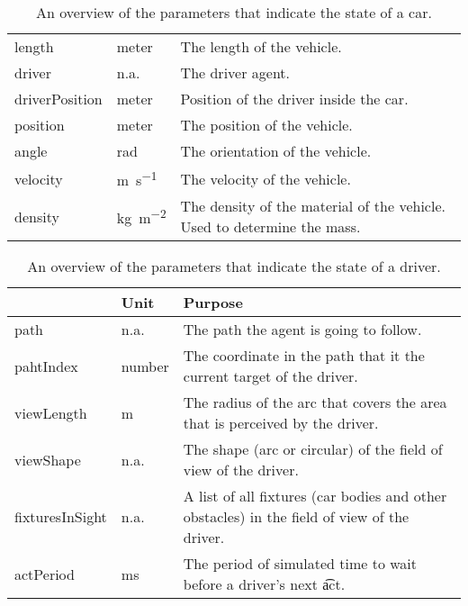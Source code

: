 \begin{table}
\begin{tabularx}{\textwidth}{>{\ttfamily}llX}
		length 					
			& \si{meter} 
			& The length of the vehicle. \\ 
		driver 					
			& n.a. 
			& The driver agent. \\
		driverPosition
			& \si{meter}
			& Position of the driver inside the car. \\
		position
			& \si{meter}
			& The position of the vehicle. \\
		angle
			& \si{\radian}
			& The orientation of the vehicle. \\
		velocity
			& \si{\meter\per\second}
			& The velocity of the vehicle. \\
		density
			& \si{\kg\per\square\meter}
			& The density of the material of the vehicle. Used to determine the mass. \\
		\bottomrule
	\end{tabularx}
	\caption{An overview of the parameters that indicate the state of a car.}
	\label{tab:par:method:model:overview:state:lowlevel:car}
\end{table}

\begin{table}
	\centering
	\begin{tabularx}{\textwidth}{>{\ttfamily}llX}
		\toprule
		\normalfont{Parameter}	&Unit & Purpose \\ 
		\midrule
		path					
			& n.a. 
			& The path the agent is going to follow. \\
		pahtIndex
			& number
			& The coordinate in the path that it the current target of the driver.\\
		viewLength 			
			& \si{\meter}
			& The radius of the arc that covers the area that is perceived by the driver.\\ 
		viewShape
			& n.a.
			& The shape (arc or circular) of the field of view of the driver.\\
		fixturesInSight
			& n.a.
			& A list of all fixtures (car bodies and other obstacles) in the field of view of the driver.\\ 
		actPeriod
			& \si{\milli\second}
			& The period of simulated time to wait before a driver's next \t{act}. \\
		\bottomrule
	\end{tabularx}
	\caption{An overview of the parameters that indicate the state of a driver.}
	\label{tab:par:method:model:overview:state:lowlevel:driver}
\end{table}

